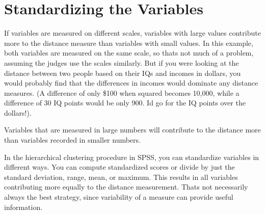 \documentclass[a4paper,12pt]{article}
\begin{document}
\section{Standardizing the Variables}
If variables are measured on different scales, variables with large values contribute
more to the distance measure than variables with small values. In this example, both
variables are measured on the same scale, so thats not much of a problem, assuming
the judges use the scales similarly. But if you were looking at the distance between two
people based on their IQs and incomes in dollars, you would probably find that the
differences in incomes would dominate any distance measures. (A difference of only
\$100 when squared becomes 10,000, while a difference of 30 IQ points would be only
900. Id go for the IQ points over the dollars!).

Variables that are measured in large numbers will contribute to the distance more than variables recorded in smaller
numbers.

In the hierarchical clustering procedure in SPSS, you can standardize variables in
different ways. You can compute standardized scores or divide by just the standard
deviation, range, mean, or maximum. This results in all variables contributing more
equally to the distance measurement. Thats not necessarily always the best strategy,
since variability of a measure can provide useful information. 
\end{document}
